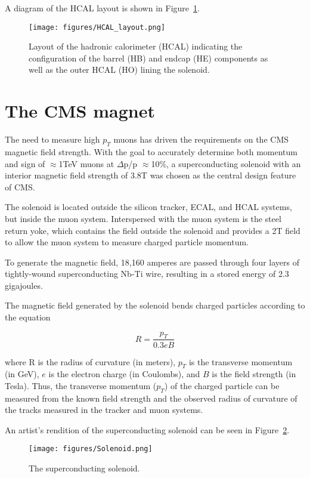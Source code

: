 A diagram of the HCAL layout is shown in Figure~\ref{fig:HCAL_layout}.

\begin{figure}\centering
  \texttt{[image: figures/HCAL\_layout.png]}
  \caption{\label{fig:HCAL_layout} Layout of the hadronic calorimeter (HCAL) indicating the configuration of the barrel (HB) and endcap (HE) components as well as the outer HCAL (HO) lining the solenoid.}
\end{figure}

\section{The CMS magnet}

The need to measure high $p_{T}$ muons has driven the requirements on the CMS magnetic field strength. With the goal to accurately determine both momentum and sign of $\approx$1TeV muons at $\Delta$p/p $\approx $10\%, a superconducting solenoid with an interior magnetic field strength of 3.8T was chosen as the central design feature of CMS.

The solenoid is located outside the silicon tracker, ECAL, and HCAL systems, but inside the muon system. Interspersed with the muon system is the steel return yoke, which contains the field outside the solenoid and provides a 2T field to allow the muon system to measure charged particle momentum. 

To generate the magnetic field, 18,160 amperes are passed through four layers of tightly-wound superconducting Nb-Ti wire, resulting in a stored energy of 2.3 gigajoules.

The magnetic field generated by the solenoid bends charged particles according to the equation

\begin{equation}
R = \frac{p_{T}}{0.3eB}
\end{equation}

\noindent where R is the radius of curvature (in meters), $p_{T}$ is the transverse momentum (in GeV), $e$ is the electron charge (in Coulombs), and $B$ is the field strength (in Tesla). Thus, the transverse momentum ($p_{T}$) of the charged particle can be measured from the known field strength and the observed radius of curvature of the tracks measured in the tracker and muon systems.\cite{TDR}

An artist's rendition of the superconducting solenoid can be seen in Figure~\ref{fig:Solenoid}.

\begin{figure}\centering
  \texttt{[image: figures/Solenoid.png]}
  \caption{\label{fig:Solenoid} The superconducting solenoid.}
\end{figure}

